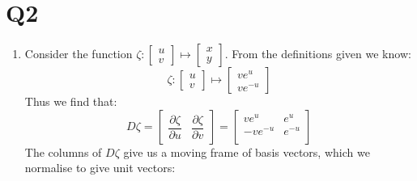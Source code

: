 \documentclass[a4paper, 11pt]{article}
\begin{document}
\def\pp#1#2{\dfrac{\partial#1}{\partial#2}}
\def\dd#1#2{\dfrac{d#1}{d#2}}


\section*{Q2}
\begin{enumerate}[label=(\alph*)]
  \item Consider the function $\zeta: \begin{bmatrix}
            u \\ v
          \end{bmatrix} \mapsto \begin{bmatrix}
            x \\ y
          \end{bmatrix}$. From the definitions given we know:
        $$
          \zeta: \begin{bmatrix}
            u \\v
          \end{bmatrix} \mapsto \begin{bmatrix}
            ve^u \\
            ve^{-u}
          \end{bmatrix}
        $$
        Thus we find that:
        $$
          D\zeta = \left[ \begin{array}{c|c}\pp\zeta u& \pp\zeta v\end{array} \right] = \begin{bmatrix}
            ve^u     & e^u    \\
            -ve^{-u} & e^{-u} \\
          \end{bmatrix}
        $$
        The columns of $D\zeta$ give us a moving frame of basis vectors, which we normalise to give unit vectors:


\end{enumerate}
\end{document}
